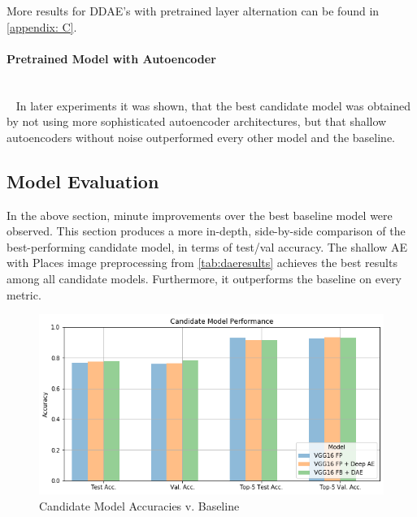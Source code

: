 \begin{table}[H]
  \centering
\end{table}
More results for DDAE's with pretrained layer alternation can be found in \autoref{appendix: C}.

\paragraph{Pretrained Model with Autoencoder} \\~
In later experiments it was shown, that the best candidate model was obtained by not using more sophisticated autoencoder architectures, but that shallow autoencoders without noise outperformed every other model and the baseline.




\subsection{Model Evaluation}
In the above section, minute improvements over the best baseline model were observed. 
This section produces a more in-depth, side-by-side comparison of the best-performing candidate model, in terms of test/val accuracy.
The shallow AE with Places image preprocessing from \autoref{tab:daeresults} achieves the best results among all candidate models. 
Furthermore, it outperforms the baseline on every metric.

\begin{figure}[H]
  \centering
    \includegraphics[width=\textwidth]{pictures/plots/candidate_acc}
    \caption{Candidate Model Accuracies v. Baseline}
    \label{fig:candidates}
\end{figure}

